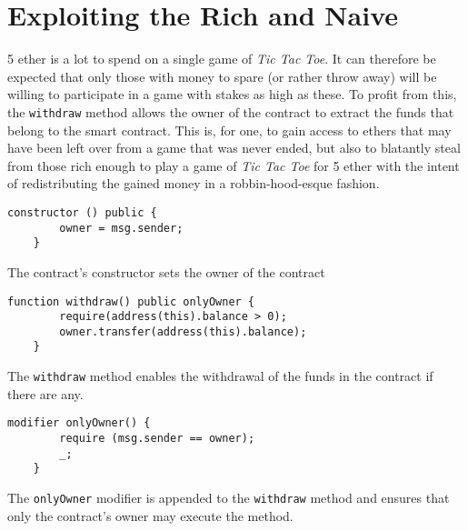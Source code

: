 \documentclass[10pt]{article}
\begin{document}
\section{Exploiting the Rich and Naive}
5 ether is a lot to spend on a single game of \emph{Tic Tac Toe}. It can therefore be expected that only those with money to spare (or rather throw away) will be willing to participate in a game with stakes as high as these. To profit from this, the \texttt{withdraw} method allows the owner of the contract to extract the funds that belong to the smart contract. This is, for one, to gain access to ethers that may have been left over from a game that was never ended, but also to blatantly steal from those rich enough to play a game of \emph{Tic Tac Toe} for 5 ether with the intent of redistributing the gained money in a robbin-hood-esque fashion.
\begin{Verbatim}[fontsize=\small]
    constructor () public {
        owner = msg.sender;
    }
\end{Verbatim}
The contract's constructor sets the owner of the contract
\begin{Verbatim}[fontsize=\small]
    function withdraw() public onlyOwner {
        require(address(this).balance > 0);
        owner.transfer(address(this).balance);
    }
\end{Verbatim}
The \texttt{withdraw} method enables the withdrawal of the funds in the contract if there are any.
\begin{Verbatim}[fontsize=\small]
    modifier onlyOwner() {
        require (msg.sender == owner);
        _;
    }
\end{Verbatim}
The \texttt{onlyOwner} modifier is appended to the \texttt{withdraw} method and ensures that only the contract's owner may execute the method.
\end{document}
